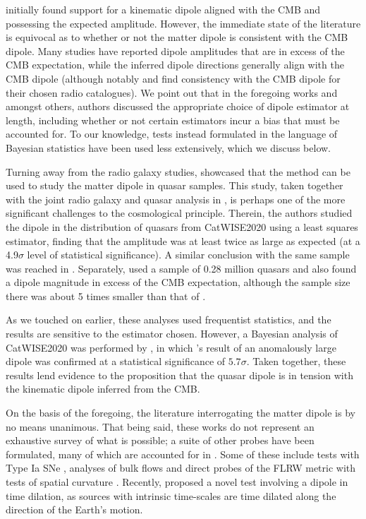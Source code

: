 \documentclass[fleqn,usenatbib]{mnras}
\begin{document}
    \citet{blake2002} initially found support for a kinematic dipole aligned with the CMB and possessing the expected amplitude.
    However, the immediate state of the literature is equivocal as to whether or not the matter dipole is consistent with the CMB dipole.
    Many studies \citep[see e.g.][]{singal2011, colin2017, bengaly2018, singal2019, siewert2021, singal2023, wagenveld2023} have reported dipole amplitudes that are in excess of the CMB expectation, while the inferred dipole directions generally align with the CMB dipole (although notably \citet{darling2022} and \citet{cheng2023} find consistency with the CMB dipole for their chosen radio catalogues).
    We point out that in the foregoing works and amongst others, authors discussed the appropriate choice of dipole estimator at length, including whether or not certain estimators incur a bias that must be accounted for.
    To our knowledge, tests instead formulated in the language of Bayesian statistics have been used less extensively, which we discuss below.
    
    Turning away from the radio galaxy studies, \cite{secrest2021} showcased that the \citet{ellis1984} method can be used to study the matter dipole in quasar samples.
    This study, taken together with the joint radio galaxy and quasar analysis in \cite{secrest2022}, is perhaps one of the more significant challenges to the cosmological principle.
    Therein, the authors studied the dipole in the distribution of quasars from CatWISE2020 \citep{marocco2021} using a least squares estimator, finding that the amplitude was at least twice as large as expected (at a 4.9$\sigma$ level of statistical significance).
    A similar conclusion with the same sample was reached in \citet{kothari2022}.
    Separately, \citet{singal2021} used a sample of 0.28 million quasars and also found a dipole magnitude in excess of the CMB expectation, although the sample size there was about 5 times smaller than that of \citet{secrest2021}.

    As we touched on earlier, these analyses used frequentist statistics, and the results are sensitive to the estimator chosen.
    However, a Bayesian analysis of CatWISE2020 was performed by \cite{dam2023}, in which \citet{secrest2021}'s result of an anomalously large dipole was confirmed at a statistical significance of $5.7\sigma$.
    Taken together, these results lend evidence to the proposition that the quasar dipole is in tension with the kinematic dipole inferred from the CMB.

    On the basis of the foregoing, the literature interrogating the matter dipole is by no means unanimous.
    That being said, these works do not represent an exhaustive survey of what is possible; a suite of other probes have been formulated, many of which are accounted for in \citet{aluri2023}.
    Some of these include tests with Type Ia SNe \citep[see e.g.][]{horstmann2022, singal2022, sorrenti2022}, analyses of bulk flows \citep[see e.g.][]{watkins2023} and direct probes of the FLRW metric with tests of spatial curvature \citep[see e.g.][]{zhou2020}.
    Recently, \citet{oayda2023} proposed a novel test involving a dipole in time dilation, as sources with intrinsic time-scales are time dilated along the direction of the Earth's motion.
    
\end{document}
